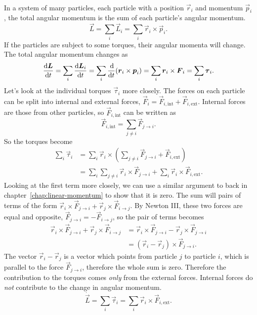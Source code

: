 \documentclass[../classical_mechanics.tex]{subfiles}
\begin{document}
        \paragraph{}
        In a system of many particles, each particle with a position $\vec{r}_i$ and momentum $\vec{p}_i$, the total angular momentum is the sum of each particle's angular momentum.
        \begin{equation}
            \vec{L}=\sum_i\vec{L}_i=\sum_i\vec{r}_i\times\vec{p}_i.
        \end{equation}
        If the particles are subject to some torques, their angular momenta will change.
        The total angular momentum changes as
        \begin{equation}
            \dv{\vec{L}}{t}=\sum_i\dv{\vec{L}_i}{t}=\sum_i\dv{}{t}(\vec{r}_i\times\vec{p}_i)=\sum_i\vec{r}_i\times\vec{F}_i=\sum_i\vec{\tau}_i.
        \end{equation}
        Let's look at the individual torques $\vec{\tau}_i$ more closely.
        The forces on each particle can be split into internal and external forces, $\vec{F}_i=\vec{F}_{i,\text{int}}+\vec{F}_{i,\text{ext}}$.
        Internal forces are those from other particles, so $\vec{F}_{i,\text{int}}$ can be written as
        \begin{equation}
            \vec{F}_{i,\text{int}}=\sum_{j\neq i}\vec{F}_{j\to i}.
        \end{equation}
        So the torques become
        \begin{align}
            \sum_i\vec{\tau}_i&=\sum_i\vec{r}_i\times\left(\sum_{j\neq i}\vec{F}_{j\to i}+\vec{F}_{i,\text{ext}}\right)\\
            &=\sum_i\sum_{j\neq i}\vec{r}_i\times\vec{F}_{j\to i}+\sum_i\vec{r}_i\times\vec{F}_{i,\text{ext}}.
        \end{align}
        Looking at the first term more closely, we can use a similar argument to back in chapter~\ref{chap:linear-momentum} to show that it is zero.
        The sum will pairs of terms of the form $\vec{r}_i\times\vec{F}_{j\to i}+\vec{r}_j\times\vec{F}_{i\to j}$.
        By Newton III, these two forces are equal and opposite, $\vec{F}_{j\to i}=-\vec{F}_{i\to j}$, so the pair of terms becomes
        \begin{align}
            \vec{r}_i\times\vec{F}_{j\to i}+\vec{r}_j\times\vec{F}_{i\to j}&=\vec{r}_i\times\vec{F}_{j\to i}-\vec{r}_j\times\vec{F}_{j\to i}\\
            &=(\vec{r}_i-\vec{r}_j)\times\vec{F}_{j\to i}.
        \end{align}
        The vector $\vec{r}_i-\vec{r}_j$ is a vector which points from particle $j$ to particle $i$, which is parallel to the force $\vec{F}_{j\to i}$, therefore the whole sum is zero.
        Therefore the contribution to the torques comes \textit{only} from the external forces.
        Internal forces do \textit{not} contribute to the change in angular momentum.
        \begin{equation}
            \dot{\vec{L}}=\sum_i\vec{\tau}_i=\sum_i\vec{r}_i\times\vec{F}_{i,\text{ext}}.
        \end{equation}
\end{document}
